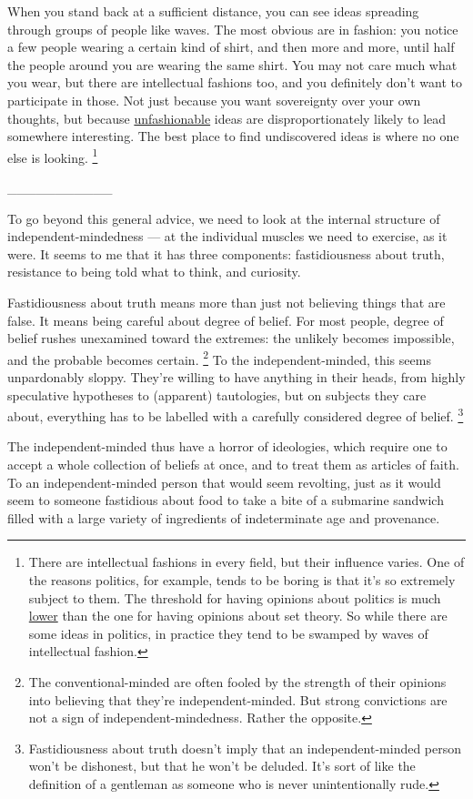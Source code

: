 \documentclass[12pt]{book}
\begin{document}
When you stand back at a sufficient distance, you can see ideas
spreading through groups of people like waves. The most obvious are in
fashion: you notice a few people wearing a certain kind of shirt, and
then more and more, until half the people around you are wearing the
same shirt. You may not care much what you wear, but there are
intellectual fashions too, and you definitely don't want to participate
in those. Not just because you want sovereignty over your own thoughts,
but because \href{nov.html}{unfashionable} ideas are disproportionately
likely to lead somewhere interesting. The best place to find
undiscovered ideas is where no one else is looking.
\footnote{There are intellectual fashions in every field, but their
influence varies. One of the reasons politics, for example, tends to be
boring is that it's so extremely subject to them. The threshold for
having opinions about politics is much \href{identity.html}{lower} than
the one for having opinions about set theory. So while there are some
ideas in politics, in practice they tend to be swamped by waves of
intellectual fashion.}

\_\_\_\_\_\_\_\_\_\_\_

To go beyond this general advice, we need to look at the internal
structure of independent-mindedness --- at the individual muscles we
need to exercise, as it were. It seems to me that it has three
components: fastidiousness about truth, resistance to being told what to
think, and curiosity.

Fastidiousness about truth means more than just not believing things
that are false. It means being careful about degree of belief. For most
people, degree of belief rushes unexamined toward the extremes: the
unlikely becomes impossible, and the probable becomes certain.
\footnote{The conventional-minded are often fooled by the strength of
their opinions into believing that they're independent-minded. But
strong convictions are not a sign of independent-mindedness. Rather the
opposite.} To the independent-minded, this seems
unpardonably sloppy. They're willing to have anything in their heads,
from highly speculative hypotheses to (apparent) tautologies, but on
subjects they care about, everything has to be labelled with a carefully
considered degree of belief. \footnote{Fastidiousness about truth doesn't imply that an
independent-minded person won't be dishonest, but that he won't be
deluded. It's sort of like the definition of a gentleman as someone who
is never unintentionally rude.}

The independent-minded thus have a horror of ideologies, which require
one to accept a whole collection of beliefs at once, and to treat them
as articles of faith. To an independent-minded person that would seem
revolting, just as it would seem to someone fastidious about food to
take a bite of a submarine sandwich filled with a large variety of
ingredients of indeterminate age and provenance.
\end{document}
